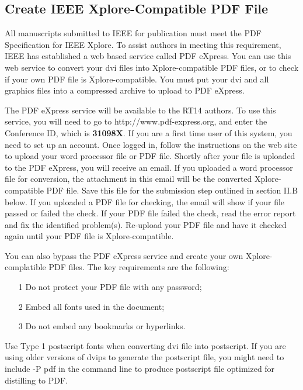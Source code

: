 \documentclass[journal]{IEEEtran}
\begin{document}
\subsection{Create IEEE Xplore-Compatible PDF File}

All manuscripts submitted to IEEE for publication must meet the PDF Specification for IEEE Xplore\cite{IEEEPDFRequirement401}. To assist authors in meeting this requirement, IEEE has established a web based service called PDF eXpress. You can use this web service to convert your dvi  files into Xplore-compatible PDF files, or to check if your own PDF file is Xplore-compatible. You must put your dvi and all graphics files into a compressed archive to upload to PDF eXpress.

The PDF eXpress service will be available to the RT14 authors. To use this service, you will need to go to http://www.pdf-express.org, and enter the Conference ID, which is \textbf{31098X}. If you are a first time user of this system, you need to set up an account.  Once logged in, follow the instructions on the web site to upload your word processor file or PDF file.  Shortly after your file is uploaded to the PDF eXpress, you will receive an email. If you uploaded a word processor file for conversion, the attachment in this email will be the converted Xplore-compatible PDF file.  Save this file for the submission step outlined in section II.B below.  If you uploaded a PDF file for checking, the email will show if your file passed or failed the check.  If your PDF file failed the check, read the error report and fix the identified problem(s).  Re-upload your PDF file and have it checked again until your PDF file is Xplore-compatible.

You can also bypass the PDF eXpress service and create your own Xplore-complatible PDF files.  The key requirements are the following:
\begin{itemize}
\item[1]	Do not protect your PDF file with any password;
\item[2]	Embed all fonts used in the document;
\item[3]	Do not embed any bookmarks or hyperlinks.
\end{itemize}


Use Type 1 postscript fonts when converting dvi file into postscript.  If you are using older versions of dvips to generate the postscript file, you might need to include -P pdf in the command line to produce postscript file optimized for distilling to PDF.
\end{document}
